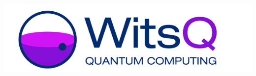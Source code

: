 \documentclass[a0,portrait]{a0poster}
\begin{document}
\begin{minipage}[t]{0.12\linewidth}%
\includegraphics[width=\linewidth]{Wits-Q-logo.png}%
\end{minipage}%

\vspace{1.3cm}%

\end{document}

